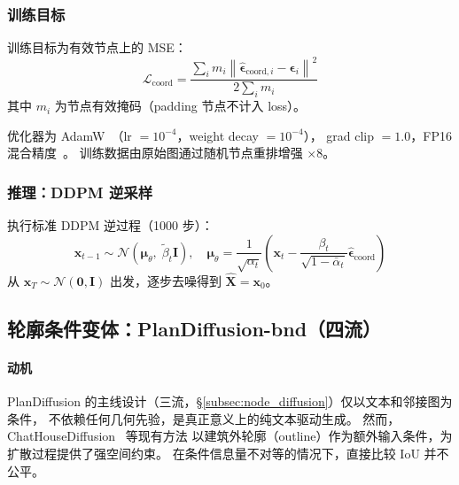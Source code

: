 \subsubsection{训练目标}

训练目标为有效节点上的 MSE：
\begin{equation}
    \mathcal{L}_{\mathrm{coord}}
        = \frac{\displaystyle\sum_{i} m_i
                 \left\|\hat{\boldsymbol{\epsilon}}_{\mathrm{coord},i}
                       - \boldsymbol{\epsilon}_i\right\|^2}
                {2\displaystyle\sum_i m_i}
    \label{eq:loss_coord}
\end{equation}
其中 $m_i$ 为节点有效掩码（padding 节点不计入 loss）。

优化器为 AdamW~\cite{loshchilov2019adamw}（lr $= 10^{-4}$，weight decay $= 10^{-4}$），
grad clip $= 1.0$，FP16 混合精度~\cite{micikevicius2018mixed}。
训练数据由原始图通过随机节点重排增强 ${\times}8$。

\subsubsection{推理：DDPM 逆采样}

执行标准 DDPM 逆过程（1000 步）：
\begin{equation}
    \mathbf{x}_{t-1} \sim \mathcal{N}\!\left(\boldsymbol{\mu}_\theta,\;\tilde{\beta}_t\mathbf{I}\right),
    \quad
    \boldsymbol{\mu}_\theta = \frac{1}{\sqrt{\alpha_t}}\!\left(
        \mathbf{x}_t - \frac{\beta_t}{\sqrt{1-\bar{\alpha}_t}}
        \hat{\boldsymbol{\epsilon}}_{\mathrm{coord}}\right)
    \label{eq:reverse}
\end{equation}
从 $\mathbf{x}_T \sim \mathcal{N}(\mathbf{0},\mathbf{I})$ 出发，逐步去噪得到 $\hat{\mathbf{X}} = \mathbf{x}_0$。

\subsection{轮廓条件变体：PlanDiffusion-bnd（四流）}
\label{subsec:node_diffusion_bnd}

\paragraph{动机}
PlanDiffusion 的主线设计（三流，§\ref{subsec:node_diffusion}）仅以文本和邻接图为条件，
不依赖任何几何先验，是真正意义上的纯文本驱动生成。
然而，ChatHouseDiffusion~\cite{qin2025chathousediffusion} 等现有方法
以建筑外轮廓（outline）作为额外输入条件，为扩散过程提供了强空间约束。
在条件信息量不对等的情况下，直接比较 IoU 并不公平。

